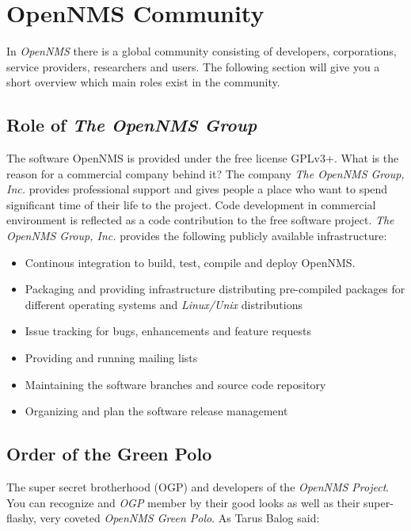 \section{OpenNMS Community}
In \emph{OpenNMS} there is a global community consisting of developers, corporations, service providers, researchers and users. The following section will give you a short overview which main roles exist in the community.

\subsection*{Role of \emph{The OpenNMS Group}}
The software OpenNMS is provided under the free license GPLv3+. What is the reason for a commercial company behind it? The company \emph{The OpenNMS Group, Inc.} provides professional support and gives people a place who want to spend significant time of their life to the project. Code development in commercial environment is reflected as a code contribution to the free software project. \emph{The OpenNMS Group, Inc.} provides the following publicly available infrastructure:

\begin{itemize}
  \item Continous integration to build, test, compile and deploy OpenNMS.
  \item Packaging and providing infrastructure distributing pre-compiled packages for different operating systems and \emph{Linux/Unix} distributions
  \item Issue tracking for bugs, enhancements and feature requests
  \item Providing and running mailing lists
  \item Maintaining the software branches and source code repository
  \item Organizing and plan the software release management
\end{itemize}

\subsection*{Order of the Green Polo}
The super secret brotherhood (OGP) and developers of the \emph{OpenNMS Project}. You can recognize and \emph{OGP} member by their good looks as well as their super-flashy, very coveted \emph{OpenNMS Green Polo}. As Tarus Balog said:
 
